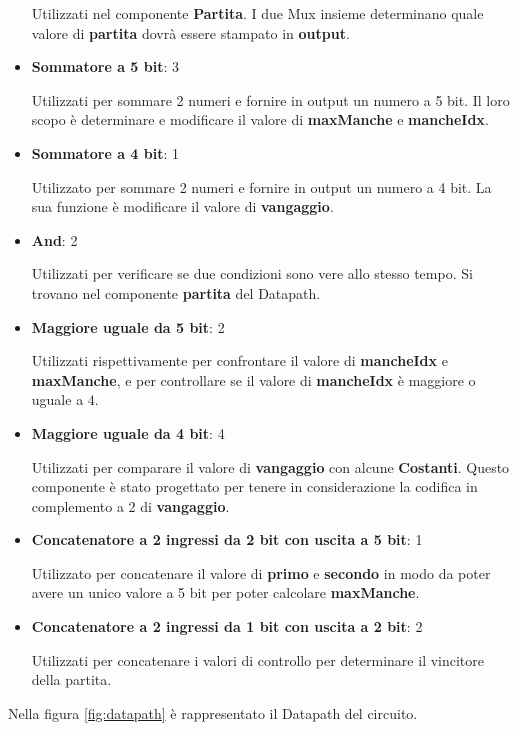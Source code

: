 \documentclass[a4paper]{article}
\begin{document}
\begin{itemize}
	      \noindent Utilizzati nel componente \textbf{Partita}. I due Mux insieme determinano quale valore di
	      \textbf{partita} dovrà essere stampato in \textbf{output}.
	\item \textbf{Sommatore a 5 bit}: 3

	      \noindent Utilizzati per sommare 2 numeri e fornire in output un numero a 5 bit.
	      Il loro scopo è determinare e modificare il valore di \textbf{maxManche} e \textbf{mancheIdx}.
	\item \textbf{Sommatore a 4 bit}: 1

	      \noindent Utilizzato per sommare 2 numeri e fornire in output un numero a 4 bit.
	      La sua funzione è modificare il valore di \textbf{vangaggio}.
	\item \textbf{And}: 2

	      \noindent Utilizzati per verificare se due condizioni sono vere allo stesso tempo. Si trovano nel componente \textbf{partita} del Datapath.
	\item \textbf{Maggiore uguale da 5 bit}: 2

	      \noindent Utilizzati rispettivamente per confrontare il valore di \textbf{mancheIdx} e \textbf{maxManche},
	      e per controllare se il valore di \textbf{mancheIdx} è maggiore o uguale a \( 4 \).
	\item \textbf{Maggiore uguale da 4 bit}: 4

	      \noindent Utilizzati per comparare il valore di \textbf{vangaggio} con alcune \textbf{Costanti}. Questo
	      componente è stato progettato per tenere in considerazione la codifica in complemento a 2 di \textbf{vangaggio}.
	\item \textbf{Concatenatore a 2 ingressi da 2 bit con uscita a 5 bit}: 1

	      \noindent Utilizzato per concatenare il valore di \textbf{primo} e \textbf{secondo} in modo da poter
	      avere un unico valore a 5 bit per poter calcolare \textbf{maxManche}.
	\item \textbf{Concatenatore a 2 ingressi da 1 bit con uscita a 2 bit}: 2

	      \noindent Utilizzati per concatenare i valori di controllo per determinare il vincitore della partita.
\end{itemize}

\noindent Nella figura \ref{fig:datapath} è rappresentato il Datapath del circuito.
\end{document}
